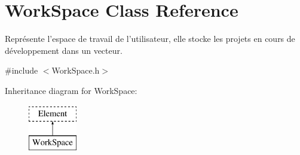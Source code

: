 \hypertarget{class_work_space}{
\section{WorkSpace Class Reference}
\label{class_work_space}
}


Représente l'espace de travail de l'utilisateur, elle stocke les projets en cours de développement dans un vecteur.  




{\ttfamily \#include $<$WorkSpace.h$>$}

Inheritance diagram for WorkSpace:\begin{figure}[H]
\begin{center}
\leavevmode
\includegraphics[height=2.000000cm]{class_work_space}
\end{center}
\end{figure}
